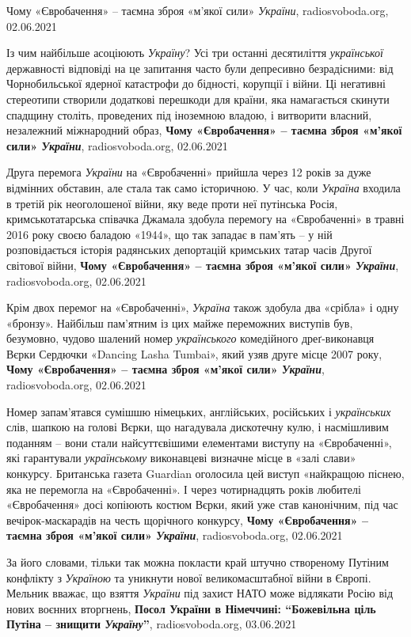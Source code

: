 Чому «Євробачення» – таємна зброя «м'якої сили» \emph{України}, radiosvoboda.org, 02.06.2021

Із чим найбільше асоціюють \emph{Україну}? Усі три останні десятиліття \emph{української}
державності відповіді на це запитання часто були депресивно безрадісними: від
Чорнобильської ядерної катастрофи до бідності, корупції і війни. Ці негативні
стереотипи створили додаткові перешкоди для країни, яка намагається скинути
спадщину століть, проведених під іноземною владою, і витворити власний,
незалежний міжнародний образ,
\textbf{Чому «Євробачення» – таємна зброя «м'якої сили» \emph{України}}, radiosvoboda.org, 02.06.2021

Друга перемога \emph{України} на «Євробаченні» прийшла через 12 років за дуже
відмінних обставин, але стала так само історичною. У час, коли \emph{Україна}
входила в третій рік неоголошеної війни, яку веде проти неї путінська Росія,
кримськотатарська співачка Джамала здобула перемогу на «Євробаченні» в травні
2016 року своєю баладою «1944», що так западає в пам'ять – у ній розповідається
історія радянських депортацій кримських татар часів Другої світової війни,
\textbf{Чому «Євробачення» – таємна зброя «м'якої сили» \emph{України}}, radiosvoboda.org, 02.06.2021

Крім двох перемог на «Євробаченні», \emph{Україна} також здобула два «срібла» і
одну «бронзу». Найбільш пам'ятним із цих майже переможних виступів був,
безумовно, чудово шалений номер \emph{українського} комедійного дреґ-виконавця
Вєрки Сердючки «Dancing Lasha Tumbai», який узяв друге місце 2007 року,
\textbf{Чому «Євробачення» – таємна зброя «м'якої сили» \emph{України}}, radiosvoboda.org, 02.06.2021

Номер запам'ятався сумішшю німецьких, англійських, російських і \emph{українських}
слів, шапкою на голові Вєрки, що нагадувала дискотечну кулю, і насмішливим
поданням – вони стали найсуттєвішими елементами виступу на «Євробаченні», які
гарантували \emph{українському} виконавцеві визначне місце в «залі слави» конкурсу.
Британська газета Guardian оголосила цей виступ «найкращою піснею, яка не
перемогла на «Євробаченні». І через чотирнадцять років любителі «Євробачення»
досі копіюють костюм Вєрки, який уже став канонічним, під час
вечірок-маскарадів на честь щорічного конкурсу,
\textbf{Чому «Євробачення» – таємна зброя «м'якої сили» \emph{України}}, radiosvoboda.org, 02.06.2021

За його словами, тільки так можна покласти край штучно створеному Путіним
конфлікту з \emph{Україною} та уникнути нової великомасштабної війни в Європі.
Мельник вважає, що взяття \emph{України} під захист НАТО може відлякати Росію
від нових воєнних вторгнень,
\textbf{Посол України в Німеччині: \enquote{Божевільна ціль Путіна – знищити \emph{Україну}}},
radiosvoboda.org, 03.06.2021

